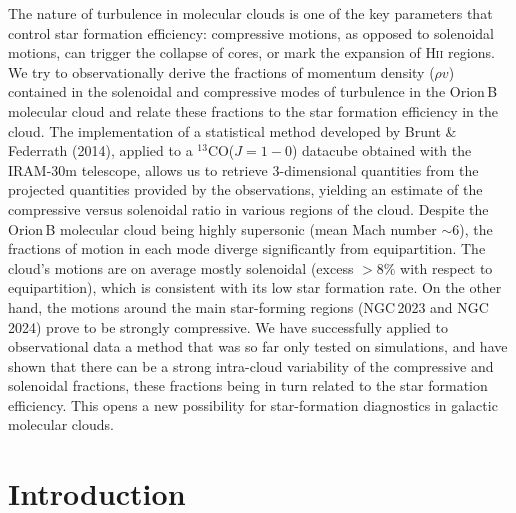 \documentclass[structabstract]{aa}
\newcommand{\Hii}{\textsc{Hii}}
\begin{document}
\date{}

\abstract%
{The nature of turbulence in molecular clouds is one of the key parameters that control star formation efficiency: compressive motions, as opposed to solenoidal motions, can trigger the collapse of cores, or mark the expansion of \Hii{} regions.}%
{We try to observationally derive the fractions of momentum density ($\rho v$) contained in the solenoidal and compressive modes of turbulence in the Orion\,B molecular cloud and relate these fractions to the star formation efficiency in the cloud.}%
{The implementation of a statistical method developed by Brunt \& Federrath (2014), applied to a $^{13}$CO($J=1-0$) datacube obtained with the IRAM-30m telescope, allows us to retrieve 3-dimensional quantities from the projected quantities provided by the observations, yielding an estimate of the compressive versus solenoidal ratio in various regions of the cloud.}%
{Despite the Orion\,B molecular cloud being highly supersonic (mean Mach number $\sim 6$), the fractions of motion in each mode diverge significantly from equipartition. The cloud's motions are on average mostly solenoidal (excess $> 8\%$ with respect to equipartition), which is consistent with its low star formation rate. On the other hand, the motions around the main star-forming regions (NGC\,2023 and NGC\,2024) prove to be strongly compressive.}%
{We have successfully applied to observational data a method that was so far only tested on simulations, and have shown that there can be a strong intra-cloud variability of the compressive and solenoidal fractions, these fractions being in turn related to the star formation efficiency. This opens a new possibility for star-formation diagnostics in galactic molecular clouds.}


\maketitle{}


\section{Introduction}
\end{document}
